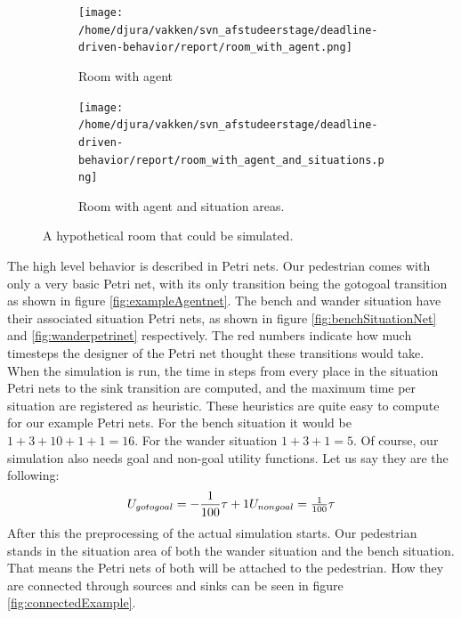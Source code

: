 \documentclass[11pt, a4paper]{book}
\begin{document}
\begin{figure}
\centering
\begin{subfigure}[b]{0.5\textwidth}
\centering
\texttt{[image: /home/djura/vakken/svn\_afstudeerstage/deadline-driven-behavior/report/room\_with\_agent.png]}
\caption{Room with agent}
\label{fig:roomwithagent}
\end{subfigure}%
\begin{subfigure}[b]{0.5\textwidth}
\centering            
\texttt{[image: /home/djura/vakken/svn\_afstudeerstage/deadline-driven-behavior/report/room\_with\_agent\_and\_situations.png]}
\caption{Room with agent and situation areas.}
\label{fig:roomwithagentsituations}
\end{subfigure}
\caption{A hypothetical room that could be simulated.}
\end{figure}

The high level behavior is described in Petri nets. Our pedestrian comes with only a very basic Petri net, with its only transition being the gotogoal transition as shown in figure \ref{fig:exampleAgentnet}. The bench and wander situation have their associated situation Petri nets, as shown in figure \ref{fig:benchSituationNet} and \ref{fig:wanderpetrinet} respectively. 
The red numbers indicate how much timesteps the designer of the Petri net thought these transitions would take. When the simulation is run, the time in steps from every place in the situation Petri nets to the sink transition are computed, and the maximum time per situation are registered as heuristic. These heuristics are quite easy to compute for our example Petri nets. For the bench situation it would be $1+3+10+1+1 = 16$. For the wander situation $1+3+1=5$. Of course, our simulation also needs goal and non-goal utility functions. Let us say they are the following:
\begin{equation}
U_{gotogoal}=-\frac{1}{100}\tau + 1 $$\\$$
U_{nongoal}=\frac{1}{100} \tau 
\end{equation}
After this the preprocessing of the actual simulation starts. Our pedestrian stands in the situation area of both the wander situation and the bench situation. That means the Petri nets of both will be attached to the pedestrian. How they are connected through sources and sinks can be seen in figure \ref{fig:connectedExample}.

\end{document}

